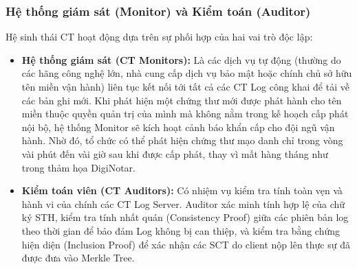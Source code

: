 \subsubsection{Hệ thống giám sát (Monitor) và Kiểm toán (Auditor)}
Hệ sinh thái CT hoạt động dựa trên sự phối hợp của hai vai trò độc lập:
\begin{itemize}
    \item \textbf{Hệ thống giám sát (CT Monitors):} Là các dịch vụ tự động (thường do các hãng công nghệ lớn, nhà cung cấp dịch vụ bảo mật hoặc chính chủ sở hữu tên miền vận hành) liên tục kết nối tới tất cả các CT Log công khai để tải về các bản ghi mới. Khi phát hiện một chứng thư mới được phát hành cho tên miền thuộc quyền quản trị của mình mà không nằm trong kế hoạch cấp phát nội bộ, hệ thống Monitor sẽ kích hoạt cảnh báo khẩn cấp cho đội ngũ vận hành. Nhờ đó, tổ chức có thể phát hiện chứng thư mạo danh chỉ trong vòng vài phút đến vài giờ sau khi được cấp phát, thay vì mất hàng tháng như trong thảm họa DigiNotar.
    \item \textbf{Kiểm toán viên (CT Auditors):} Có nhiệm vụ kiểm tra tính toàn vẹn và hành vi của chính các CT Log Server. Auditor xác minh tính hợp lệ của chữ ký STH, kiểm tra tính nhất quán (Consistency Proof) giữa các phiên bản log theo thời gian để bảo đảm Log không bị can thiệp, và kiểm tra bằng chứng hiện diện (Inclusion Proof) để xác nhận các SCT do client nộp lên thực sự đã được đưa vào Merkle Tree.
\end{itemize}

